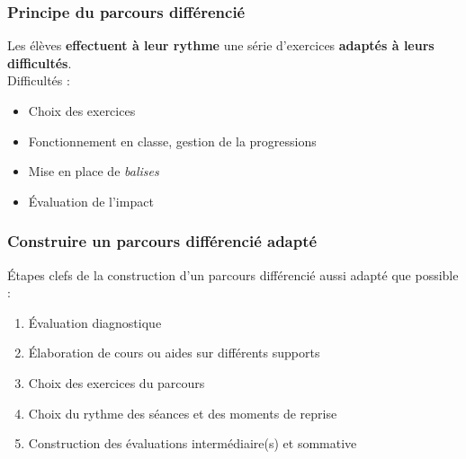 \begin{frame}
    \frametitle{Principe du parcours différencié}
    \vspace*{0.8cm}
	Les élèves \textbf{effectuent à leur rythme} une série d'exercices \textbf{adaptés à leurs difficultés}.\\
	\vspace*{1cm}
	Difficultés :
	\begin{itemize}
		\item Choix des exercices
		\item Fonctionnement en classe, gestion de la progressions
		\item Mise en place de \textit{balises}
		\item Évaluation de l'impact
	\end{itemize}
\end{frame}

\begin{frame}
	\frametitle{Construire un parcours différencié adapté}
	\vspace*{0.8cm}
	\'{E}tapes clefs de la construction d'un parcours différencié aussi adapté que possible :\\
	\begin{enumerate}
		\item \'{E}valuation diagnostique
		\item \'{E}laboration de cours ou aides sur différents supports
		\item Choix des exercices du parcours
		\item Choix du rythme des séances et des moments de reprise
		\item Construction des évaluations intermédiaire(s) et sommative
	\end{enumerate}
\end{frame}
